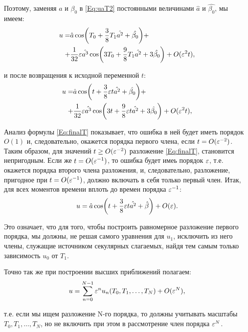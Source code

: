 Поэтому, заменяя $a$ и $\beta_0$ в \eqref{Eq:uaT2} постоянными величинами
$\hat{a}$ и $\hat{\beta_0}$, мы имеем:
\begin{align*}
    u = & \hat{a} \cos(T_0 + \frac{3}{8} T_1 \hat{a^2} + \hat{\beta_0}) + \\
    + & \frac{1}{32} \varepsilon \hat{a^3} \cos(3 T_0 + \frac{9}{8} T_1 \hat{a^2} +
    3 \hat{\beta_0} ) + O(\varepsilon^2 t),
\end{align*}

и после возвращения к исходной переменной $t$:
\begin{align}
    u = & \hat{a} \cos(t + \frac{3}{8} \varepsilon t \hat{a^2} + \hat{\beta_0}) + \nonumber \\
    + & \frac{1}{32} \varepsilon \hat{a^3} \cos(3 t + \frac{9}{8} \varepsilon t \hat{a^2} +
    3 \hat{\beta_0} ) + O(\varepsilon^2 t), \label{Eq:finalT}
\end{align}

Анализ формулы \eqref{Eq:finalT} показывает,
что ошибка в ней будет иметь порядок $O(1)$ и,
следовательно, окажется порядка первого члена,
если $t = O(\varepsilon^{-2})$. Таким образом,
для значений $t \geq O(\varepsilon^{-2})$ разложение \eqref{Eq:finalT},
становится непригодным. Если же $t = O(\varepsilon^{-1})$,
то ошибка будет имеь порядок $\varepsilon$,
т.е. окажется порядка второго члена разложения, и,
следовательно, разложение, пригодное при $t = O(\varepsilon^{-1})$,
должно включать в себя только первый член.
Итак, для всех моментов времени вплоть до времен порядка $\varepsilon^{-1}$:
\begin{equation*}
    u = \hat{a} \cos(t + \frac{3}{8} \varepsilon t \hat{a^2} + \hat{\beta}) + O(\varepsilon). 
\end{equation*}

Это означает, что для того, чтобы построить равномерное разложение
первого порядка, мы должны, не решая самого уравнения
для $u_1$, исключить из него члены, служащие источником секулярных слагаемых,
найдя тем самым только зависимость $u_0$ от $T_1$.

Точно так же при построении высших приближений полагаем:
\begin{equation*}
    u = \sum_{n=0}^{N-1} \varepsilon^n u_n(T_0, T_1, \dots, T_N) + O(\varepsilon^N), 
\end{equation*}

т.е. если мы ищем разложение N-го порядка,
то должны учитывать масштабы $T_0, T_1, \dots, T_N$,
но не включить при этом в рассмотрение член порядка $\varepsilon^N$.


